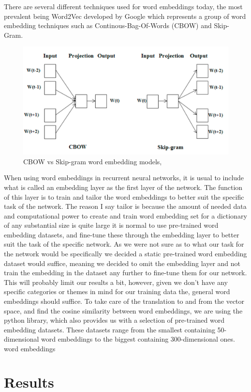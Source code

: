 \documentclass[12pt]{article}
\begin{document}
There are several different techniques used for word embeddings today, the most prevalent being Word2Vec developed by Google which represents a group of word embedding techniques such as Continous-Bag-Of-Words (CBOW) and Skip-Gram. 

\begin{figure}
    \centering
    \includegraphics[width=0.5\linewidth]{texfiles//images/skip_gram_vs_cbow.png}
    \caption{CBOW vs Skip-gram word embedding models, \cite{jatnika2019word2vec}}
    \label{fig:enter-label}
\end{figure}

When using word embeddings in recurrent neural networks, it is usual to include what is called an embedding layer as the first layer of the network. The function of this layer is to train and tailor the word embeddings to better suit the specific task of the network. The reason I say tailor is because the amount of needed data and computational power to create and train word embedding set for a dictionary of any substantial size is quite large it is normal to use pre-trained word embedding datasets, and fine-tune these through the embedding layer to better suit the task of the specific network. As we were not sure as to what our task for the network would be specifically we decided a static pre-trained word embedding dataset would suffice, meaning we decided to omit the embedding layer and not train the embedding in the dataset any further to fine-tune them for our network. This will probably limit our results a bit, however, given we don't have any specific categories or themes in mind for our training data the, general word embeddings should suffice.
To take care of the translation to and from the vector space, and find the cosine similarity between word embeddings, we are using the \cite{Spacy} python library, which also provides us with a selection of pre-trained word embedding datasets. These datasets range from the smallest containing 50-dimensional word embeddings to the biggest containing 300-dimensional ones.
word embeddings

\section{Results}
\end{document}
